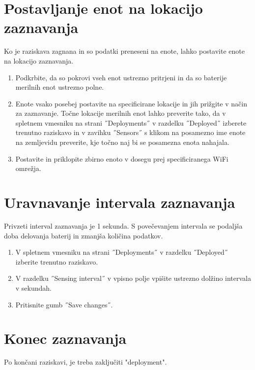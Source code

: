 \documentclass[a4paper, 12pt]{book}
\begin{document}
    
    \section{Postavljanje enot na lokacijo zaznavanja}
    
    Ko je raziskava zagnana in so podatki preneseni na enote, lahko postavite enote na lokacijo zaznavanja. 
    
    \begin{enumerate}
    \item Podkrbite, da so pokrovi vseh enot ustrezno pritrjeni in da so baterije merilnih enot ustrezno polne.
    \item Enote vsako posebej postavite na specificirane lokacije in jih prižgite v način za zaznavanje. Točne lokacije merilnih enot lahko preverite tako, da v spletnem vmesniku na strani ˝Deployments˝ v razdelku ˝Deployed˝ izberete trenutno raziskavo in v zavihku ˝Sensors˝ s klikom na posamezno ime enote na zemljevidu preverite, kje točno naj bi se posamezna enota nahajala. 
    \item Postavite in priklopite zbirno enoto v dosegu prej specificiranega WiFi omrežja.
    \end{enumerate}
    
    \section{Uravnavanje intervala zaznavanja}
    
    Privzeti interval zaznavanja je 1 sekunda. S povečevanjem intervala se podaljša doba delovanja baterij in zmanjša količina podatkov.
    
    \begin{enumerate}
        \item V spletnem vmesniku na strani ˝Deployments˝ v razdelku ˝Deployed˝ izberite trenutno raziskavo. 
        \item V razdelku ˝Sensing interval˝ v vpisno polje vpišite ustrezno dolžino intervala v sekundah.
        \item Pritisnite gumb ˝Save changes˝. 
    \end{enumerate}
    
    \section{Konec zaznavanja}
    
    Po končani raziskavi, je treba zaključiti "deployment".
    
\end{document}
